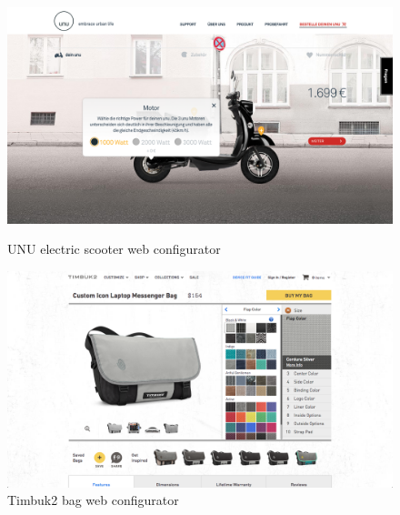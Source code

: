 \documentclass[../medieninformatik-arbeit.tex]{subfiles}
\begin{document}
\begin{figure}[h]
\captionsetup{width=0.4\textwidth}
\centering
\begin{minipage}{.45\textwidth}
\centering
  \includegraphics[width=\linewidth]{RelatedWork/img/unu-config}
  \caption{\protect UNU electric scooter web configurator \cite{unu:2015:Online}}
\label{fig:unu-config}
\end{minipage}
\begin{minipage}{.45\textwidth}
\centering
  \includegraphics[width=\linewidth]{RelatedWork/img/timbuk2-config}
  \caption{\protect Timbuk2 bag web configurator \cite{timbuk2:2015:Online}}
\label{fig:timbuk2-config}
\end{minipage}
\end{figure}
\end{document}
